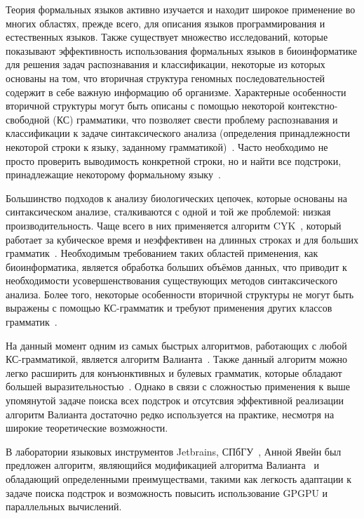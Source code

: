 \documentclass[14pt]{matmex-diploma-custom}
\begin{document}
Теория формальных языков активно изучается и находит широкое применение во многих областях, прежде всего, для описания языков программирования и естественных языков. 
Также существует множество исследований, которые показывают эффективность использования формальных языков в биоинформатике  для решения задач распознавания и классификации, некоторые из которых основаны на том, что вторичная структура геномных последовательностей содержит в себе важную информацию об организме. 
Характерные особенности вторичной структуры могут быть описаны с помощью некоторой контекстно-свободной (КС) грамматики, что позволяет свести проблему распознавания и классификации к задаче синтаксического анализа (определения принадлежности некоторой строки к языку, заданному грамматикой)~\cite{knudsen1999rna, dowell2004evaluation, rivas2000language}. 
Часто необходимо не просто проверить выводимость конкретной строки, но и найти все подстроки, принадлежащие некоторому формальному языку~\cite{durbin1996biological}.

Большинство подходов к анализу биологических цепочек, которые основаны на синтаксическом анализе, сталкиваются с одной и той же проблемой: низкая производительность. 
Чаще всего в них применяется алгоритм CYK~\cite{kasami1966efficient, Younger:1966:CLP:1441427.1442019}, который работает за кубическое время и неэффективен на длинных строках и для больших грамматик~\cite{liu2005parallel}. 
Необходимым требованием таких областей применения, как биоинформатика, является обработка больших объёмов данных, что приводит к необходимости усовершенствования существующих методов синтаксического анализа.
Более того, некоторые особенности вторичной структуры не могут быть выражены с помощью КС-грамматик и требуют применения других классов грамматик~\cite{zier2013rna}.

На данный момент одним из самых быстрых алгоритмов, работающих с любой КС-грамматикой, является алгоритм Валианта~\cite{Valiant:1975:GCR:1739932.1740048}. 
Также данный алгоритм можно легко расширить для конъюнктивных и булевых грамматик, которые обладают большей выразительностью~\cite{Okhotin:2014:PMM:2565359.2565379}. 
Однако в связи с сложностью  применения к выше упомянутой задаче поиска всех подстрок и отсутсвия эффективной реализации алгоритм Валианта достаточно редко используется на практике, несмотря на широкие теоретические возможности.

В лаборатории языковых инструментов Jetbrains, СПбГУ~\cite{jetbrains}, Анной Явейн был предложен алгоритм, являющийся модификацией алгоритма Валианта~\cite{alg} и обладающий определенными преимуществами, такими как легкость адаптации к задаче поиска подстрок и возможность повысить использование GPGPU и параллельных вычислений.
\end{document}

